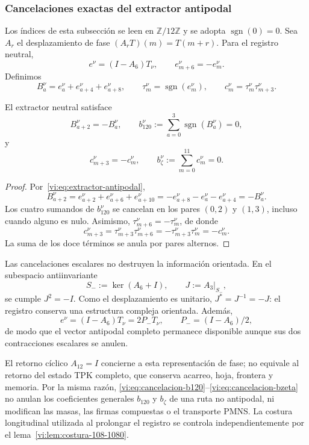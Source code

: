\subsubsection{Cancelaciones exactas del extractor antipodal}
\label{vi:subsubsec:cancelaciones-antipodales}

Los índices de esta subsección se leen en \(\mathbb Z/12\mathbb Z\) y
se adopta \(\operatorname{sgn}(0)=0\). Sea \(A_r\) el desplazamiento de
fase \((A_rT)(m)=T(m+r)\). Para el registro neutral,
\begin{equation}
 e^\nu=(I-A_6)T_\nu,
 \qquad e^\nu_{m+6}=-e^\nu_m.
 \label{vi:eq:extractor-antipodal}
\end{equation}
Definimos
\[
 B_a^\nu=e_a^\nu+e_{a+4}^\nu+e_{a+8}^\nu,
 \qquad
 \tau_m^\nu=\operatorname{sgn}(e_m^\nu),
 \qquad
 c_m^\nu=\tau_m^\nu\tau_{m+3}^\nu.
\]

\begin{proposition}
\label{vi:prop:cancelaciones-antipodales}
El extractor neutral satisface
\begin{equation}
 B_{a+2}^\nu=-B_a^\nu,\qquad
 b_{120}^\nu:=\sum_{a=0}^{3}\operatorname{sgn}(B_a^\nu)=0,
 \label{vi:eq:cancelacion-b120}
\end{equation}
y
\begin{equation}
 c_{m+3}^\nu=-c_m^\nu,\qquad
 b_\zeta^\nu:=\sum_{m=0}^{11}c_m^\nu=0.
 \label{vi:eq:cancelacion-bzeta}
\end{equation}
\end{proposition}

\begin{proof}
Por~\eqref{vi:eq:extractor-antipodal},
\[
 B_{a+2}^\nu
 =e_{a+2}^\nu+e_{a+6}^\nu+e_{a+10}^\nu
 =-e_{a+8}^\nu-e_a^\nu-e_{a+4}^\nu=-B_a^\nu.
\]
Los cuatro sumandos de \(b_{120}^\nu\) se cancelan en los pares
\((0,2)\) y \((1,3)\), incluso cuando alguno es nulo. Asimismo,
\(\tau_{m+6}^\nu=-\tau_m^\nu\), de donde
\[
 c_{m+3}^\nu
 =\tau_{m+3}^\nu\tau_{m+6}^\nu
 =-\tau_{m+3}^\nu\tau_m^\nu=-c_m^\nu.
\]
La suma de los doce términos se anula por pares alternos.
\end{proof}

Las cancelaciones escalares no destruyen la información orientada. En el
subespacio antiinvariante
\[
 S_-:=\ker(A_6+I),
 \qquad J:=A_3\big|_{S_-},
\]
se cumple \(J^2=-I\). Como el desplazamiento es unitario,
\(J^*=J^{-1}=-J\): el registro conserva una estructura compleja orientada.
Además,
\[
 e^\nu=(I-A_6)T_\nu=2P_-T_\nu,
 \qquad P_-=(I-A_6)/2,
\]
de modo que el vector antipodal completo permanece disponible aunque sus
dos contracciones escalares se anulen.

El retorno cíclico \(A_{12}=I\) concierne a esta representación de fase;
no equivale al retorno del estado TPK completo, que conserva acarreo, hoja,
frontera y memoria. Por la misma razón,
\eqref{vi:eq:cancelacion-b120}--\eqref{vi:eq:cancelacion-bzeta} no anulan
los coeficientes generales \(b_{120}\) y \(b_\zeta\) de una ruta no
antipodal, ni modifican las masas, las firmas compuestas o el transporte
PMNS. La costura longitudinal utilizada al prolongar el registro se
controla independientemente por el
lema~\ref{vi:lem:costura-108-1080}.
